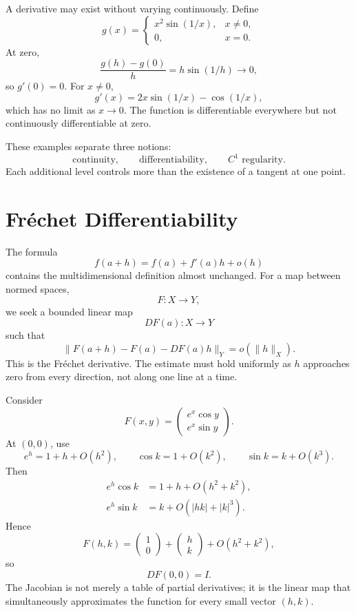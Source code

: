 A derivative may exist without varying continuously.  Define
\[
  g(x)=
  \begin{cases}
    x^2\sin(1/x),&x\ne0,\\
    0,&x=0.
  \end{cases}
\]
At zero,
\[
  \frac{g(h)-g(0)}{h}
  =h\sin(1/h)\longrightarrow0,
\]
so \(g'(0)=0\).  For \(x\ne0\),
\[
  g'(x)=2x\sin(1/x)-\cos(1/x),
\]
which has no limit as \(x\to0\).  The function is differentiable everywhere but not continuously differentiable at zero.

These examples separate three notions:
\[
  \text{continuity},
  \qquad
  \text{differentiability},
  \qquad
  C^1\text{ regularity}.
\]
Each additional level controls more than the existence of a tangent at one point.

\section{Fr\'echet Differentiability}

The formula
\[
  f(a+h)=f(a)+f'(a)h+o(h)
\]
contains the multidimensional definition almost unchanged.  For a map between normed spaces,
\[
  F:X\to Y,
\]
we seek a bounded linear map
\[
  DF(a):X\to Y
\]
such that
\[
  \boxed{
  \|F(a+h)-F(a)-DF(a)h\|_Y
  =o(\|h\|_X).}
\]
This is the Fr\'echet derivative.  The estimate must hold uniformly as \(h\) approaches zero from every direction, not along one line at a time.

Consider
\[
  F(x,y)=
  \begin{pmatrix}
    e^x\cos y\\
    e^x\sin y
  \end{pmatrix}.
\]
At \((0,0)\), use
\[
  e^h=1+h+O(h^2),
  \qquad
  \cos k=1+O(k^2),
  \qquad
  \sin k=k+O(k^3).
\]
Then
\[
\begin{aligned}
  e^h\cos k&=1+h+O(h^2+k^2),\\
  e^h\sin k&=k+O(|hk|+|k|^3).
\end{aligned}
\]
Hence
\[
  F(h,k)
  =
  \begin{pmatrix}1\\0\end{pmatrix}
  +
  \begin{pmatrix}h\\k\end{pmatrix}
  +O(h^2+k^2),
\]
so
\[
  DF(0,0)=I.
\]
The Jacobian is not merely a table of partial derivatives; it is the linear map that simultaneously approximates the function for every small vector \((h,k)\).

